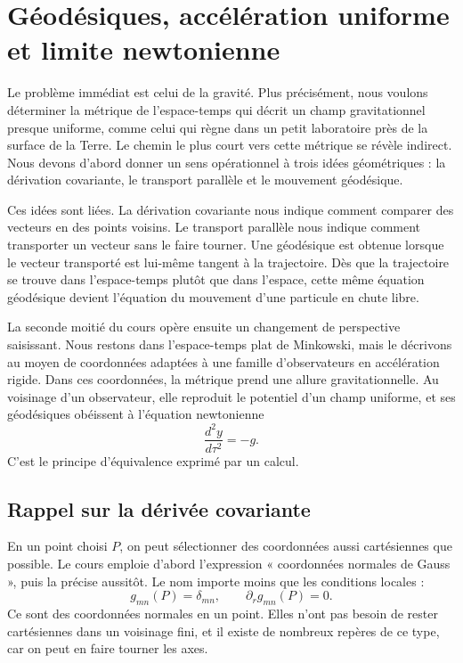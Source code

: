 \chapter{Géodésiques, accélération uniforme et limite newtonienne}

Le problème immédiat est celui de la gravité. Plus précisément, nous voulons déterminer la métrique de l’espace-temps qui décrit un champ gravitationnel presque uniforme, comme celui qui règne dans un petit laboratoire près de la surface de la Terre. Le chemin le plus court vers cette métrique se révèle indirect. Nous devons d’abord donner un sens opérationnel à trois idées géométriques : la dérivation covariante, le transport parallèle et le mouvement géodésique.

Ces idées sont liées. La dérivation covariante nous indique comment comparer des vecteurs en des points voisins. Le transport parallèle nous indique comment transporter un vecteur sans le faire tourner. Une géodésique est obtenue lorsque le vecteur transporté est lui-même tangent à la trajectoire. Dès que la trajectoire se trouve dans l’espace-temps plutôt que dans l’espace, cette même équation géodésique devient l’équation du mouvement d’une particule en chute libre.

La seconde moitié du cours opère ensuite un changement de perspective saisissant. Nous restons dans l’espace-temps plat de Minkowski, mais le décrivons au moyen de coordonnées adaptées à une famille d’observateurs en accélération rigide. Dans ces coordonnées, la métrique prend une allure gravitationnelle. Au voisinage d’un observateur, elle reproduit le potentiel d’un champ uniforme, et ses géodésiques obéissent à l’équation newtonienne
\begin{equation}
\frac{d^2y}{d\tau^2}=-g.
\end{equation}
C’est le principe d’équivalence exprimé par un calcul.

\section{Rappel sur la dérivée covariante}

En un point choisi \(P\), on peut sélectionner des coordonnées aussi cartésiennes que possible. Le cours emploie d’abord l’expression « coordonnées normales de Gauss », puis la précise aussitôt. Le nom importe moins que les conditions locales :
\begin{equation}
g_{mn}(P)=\delta_{mn},
\qquad
\partial_r g_{mn}(P)=0.
\label{eq:l4-normal-point}
\end{equation}
Ce sont des coordonnées normales en un point. Elles n’ont pas besoin de rester cartésiennes dans un voisinage fini, et il existe de nombreux repères de ce type, car on peut en faire tourner les axes.

